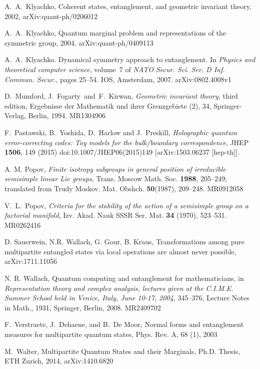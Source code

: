 \documentclass[12pt]{article}
\theoremstyle{definition}
\begin{document}
\begin{thebibliography}{BGOWW}
A.~A.~Klyachko,  Coherent states, entanglement, and geometric invariant theory,
2002, arXiv:quant-ph/0206012

A.~A.~Klyachko,  Quantum marginal problem and representations of
the symmetric group, 2004, arXiv:quant-ph/0409113

A.~A.~Klyachko.
\newblock Dynamical symmetry approach to entanglement.
\newblock In {\em Physics and theoretical computer science}, volume~7 of {\em
  NATO Secur. Sci. Ser. D Inf. Commun. Secur.}, pages 25--54. IOS, Amsterdam,
  2007.
\newblock arXiv:0802.4008v1

D.~Mumford, J.~Fogarty\ and\ F.~Kirwan, {\it Geometric invariant theory},
third edition, Ergebnisse der Mathematik und ihrer Grenzgebiete (2), 34,
Springer-Verlag, Berlin, 1994. MR1304906


  F.~Pastawski, B.~Yoshida, D.~Harlow and J.~Preskill,
  {\em Holographic quantum error-correcting codes: Toy models for the bulk/boundary correspondence},
  JHEP {\bf 1506}, 149 (2015)
  doi:10.1007/JHEP06(2015)149
  [arXiv:1503.06237 [hep-th]].
  
 A. M. Popov, {\em Finite isotropy subgroups in general position of irreducible semisimple linear Lie groups},
 Trans. Moscow Math. Soc. {\bf 1988}, 205--249; translated from Trudy Moskov. Mat. Obshch. {\bf 50}(1987), 209--248. MR0912058
 
V.~L.~Popov, {\em Criteria for the stability of the action of a semisimple
group on a factorial manifold}, Izv. Akad. Nauk SSSR Ser.
Mat. {\bf 34} (1970), 523--531. MR0262416


D. Sauerwein, N.R. Wallach, G. Gour, B. Kraus, Transformations among pure multipartite entangled states via local operations are almost never possible, arXiv:1711.11056 

N. R. Wallach, Quantum computing and entanglement for mathematicians, in
{\it Representation theory and complex analysis, lectures given
at the C.I.M.E.  Summer School held in Venice, Italy, June 10-17, 2004},
345--376, Lecture Notes in Math., 1931, Springer, Berlin, 2008. MR2409702

F.~Verstraete, J.~Dehaene, and B.~De Moor, Normal forms and entanglement measures for multipartite quantum states, Phys. Rev. A, 68 (1), 2003

M.~Walter, Multipartite Quantum States and their Marginals, Ph.D.
Thesis, ETH Zurich, 2014, arXiv:1410.6820

\end{thebibliography}
\end{document}

